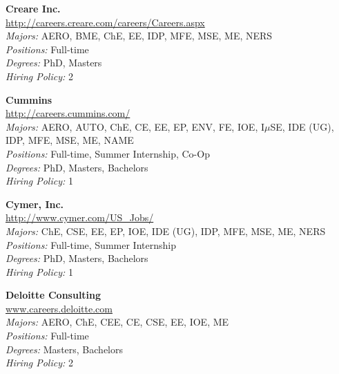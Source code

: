 \documentclass[twoside]{article}
\begin{document}
\begin{center}
\begin{multicols}{3}
\begin{minipage}{.9\columnwidth}{\Large\bf Creare Inc. }\\
	\url{http://careers.creare.com/careers/Careers.aspx}\\
	\emph{Majors:} AERO, BME, ChE, EE, IDP, MFE, MSE, ME, NERS\\
	\emph{Positions:} Full-time\\
	\emph{Degrees:} PhD, Masters\\
	\emph{Hiring Policy:} 2\\
\end{minipage}
 
\begin{minipage}{.9\columnwidth}{\Large\bf Cummins }\\
	\url{http://careers.cummins.com/}\\
	\emph{Majors:} AERO, AUTO, ChE, CE, EE, EP, ENV, FE, IOE, I$\mu$SE, IDE (UG), IDP, MFE, MSE, ME, NAME\\
	\emph{Positions:} Full-time, Summer Internship, Co-Op\\
	\emph{Degrees:} PhD, Masters, Bachelors\\
	\emph{Hiring Policy:} 1\\
\end{minipage}
 
\begin{minipage}{.9\columnwidth}{\Large\bf Cymer, Inc. }\\
	\url{http://www.cymer.com/US_Jobs/}\\
	\emph{Majors:} ChE, CSE, EE, EP, IOE, IDE (UG), IDP, MFE, MSE, ME, NERS\\
	\emph{Positions:} Full-time, Summer Internship\\
	\emph{Degrees:} PhD, Masters, Bachelors\\
	\emph{Hiring Policy:} 1\\
\end{minipage}
 
\begin{minipage}{.9\columnwidth}{\Large\bf Deloitte Consulting }\\
	\url{www.careers.deloitte.com}\\
	\emph{Majors:} AERO, ChE, CEE, CE, CSE, EE, IOE, ME\\
	\emph{Positions:} Full-time\\
	\emph{Degrees:} Masters, Bachelors\\
	\emph{Hiring Policy:} 2\\
\end{minipage}
 

\end{multicols}
\end{center}
\end{document}
